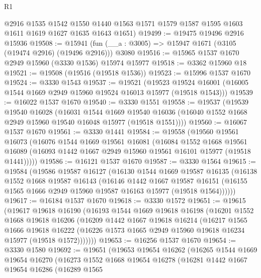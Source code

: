 \begin{lexlean}{R1}
\begin{coremodule}
      @2916
      @1535
      @1542
      @1550
      @1440
      @1563
      @1571
      @1579
      @1587
      @1595
      @1603
      @1611
      @1619
      @1627
      @1635
      @1643
      @1651)
@19499 := @19475 @19496 @2916 @15936
@19508 := @15941 (fun (__a : @3005) => @15947 @1671 (@3105 (@19474 @2916) (@19496 @2916))) @3080
@19516 := @15965 @1537 @1670 @2949 @15960 (@3330 @1536) @15974 @15977
@19518 := @3362 @15960 @18
@19521 := @19508 (@19516 (@19518 @1536))
@19523 := @15996 @1537 @1670
@19524 := @3330 @1543
@19537 := @19521
    (@19523 @19524 @16001 (@16005 @1544 @1669 @2949 @15960 @19524 @16013 @15977 (@19518 @1543)))
@19539 := @16022 @1537 @1670
@19540 := @3330 @1551
@19558 := @19537
    (@19539
      @19540
      @16028
      (@16031
        @1544
        @1669
        @19540
        @16036
        (@16040 @1552 @1668 @2949 @15960 @19540 @16048 @15977 (@19518 @1551))))
@19560 := @16067 @1537 @1670
@19561 := @3330 @1441
@19584 := @19558
    (@19560
      @19561
      @16073
      (@16076
        @1544
        @1669
        @19561
        @16081
        (@16084
          @1552
          @1668
          @19561
          @16089
          (@16093 @1442 @1667 @2949 @15960 @19561 @16101 @15977 (@19518 @1441)))))
@19586 := @16121 @1537 @1670
@19587 := @3330 @1564
@19615 := @19584
    (@19586
      @19587
      @16127
      (@16130
        @1544
        @1669
        @19587
        @16135
        (@16138
          @1552
          @1668
          @19587
          @16143
          (@16146
            @1442
            @1667
            @19587
            @16151
            (@16155 @1565 @1666 @2949 @15960 @19587 @16163 @15977 (@19518 @1564))))))
@19617 := @16184 @1537 @1670
@19618 := @3330 @1572
@19651 := @19615
    (@19617
      @19618
      @16190
      (@16193
        @1544
        @1669
        @19618
        @16198
        (@16201
          @1552
          @1668
          @19618
          @16206
          (@16209
            @1442
            @1667
            @19618
            @16214
            (@16217
              @1565
              @1666
              @19618
              @16222
              (@16226 @1573 @1665 @2949 @15960 @19618 @16234 @15977 (@19518 @1572)))))))
@19653 := @16256 @1537 @1670
@19654 := @3330 @1580
@19692 := @19651
    (@19653
      @19654
      @16262
      (@16265
        @1544
        @1669
        @19654
        @16270
        (@16273
          @1552
          @1668
          @19654
          @16278
          (@16281
            @1442
            @1667
            @19654
            @16286
            (@16289
              @1565

\end{coremodule}
\end{lexlean}
